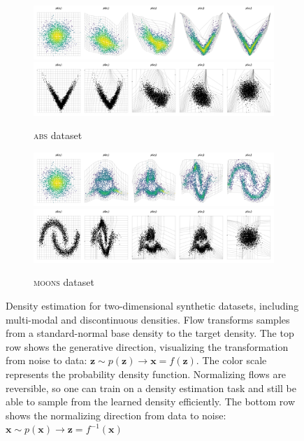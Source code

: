 \begin{figure}[!htb]
    \begin{center}
      \begin{subfigure}{\linewidth}
          \centering
          \includegraphics[width=0.75\linewidth,trim=0cm 0cm 0cm 1.6cm, clip]{figures/2D/ABS/plot_generative_flow_evolution.png}
          \includegraphics[width=0.75\linewidth,trim=0cm 0cm 0cm 1.6cm, clip]{figures/2D/ABS/plot_normalizing_flow_evolution.png}
          \caption{\textsc{abs} dataset}
          \label{fig:NF_2D_ABS}
      \end{subfigure}
      \vspace{1em}
      \begin{subfigure}{\linewidth}
        \centering
        \includegraphics[width=0.75\linewidth,trim=0cm 0cm 0cm 1.6cm, clip]{figures/2D/MOONS/plot_generative_flow_evolution.png}
        \includegraphics[width=0.75\linewidth,trim=0cm 0cm 0cm 1.6cm, clip]{figures/2D/MOONS/plot_normalizing_flow_evolution.png}
        \caption{\textsc{moons} dataset}
        \label{fig:NF_2D_MOONS}
      \end{subfigure}
    \caption{Density estimation for two-dimensional synthetic datasets, including multi-modal and discontinuous densities. Flow transforms samples from a standard-normal base density to the target density. The top row shows the generative direction, visualizing the transformation from noise to data: $\mathbf{z} \sim p(\mathbf{z}) \rightarrow \mathbf{x} = f(\mathbf{z})$. The color scale represents the probability density function. Normalizing flows are reversible, so one can train on a density estimation task and still be able to sample from the learned density efficiently. The bottom row shows the normalizing direction from data to noise: $\mathbf{x} \sim p(\mathbf{x}) \rightarrow \mathbf{z} = f^{-1}(\mathbf{x})$}
    \label{fig:nf_2d_examples:2}
  \end{center}
  \end{figure}
  



